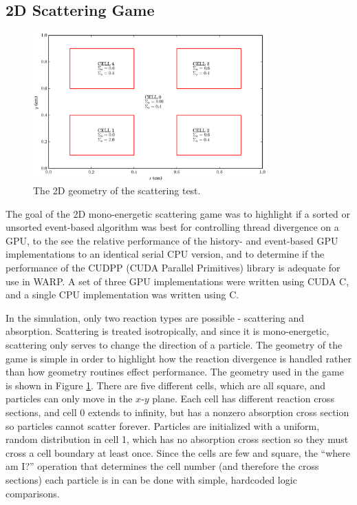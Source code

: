 \subsection{2D Scattering Game}

\begin{figure}[h!] 
  \centering
    \includegraphics[width=0.8\textwidth]{graphics/prelim_geom.eps}
     \caption{The 2D geometry of the scattering test. \label{prelim_geom} }
\end{figure}

The goal of the 2D mono-energetic scattering game was to highlight if a sorted or unsorted event-based algorithm was best for controlling thread divergence on a GPU, to the see the relative performance of the history- and event-based GPU implementations to an identical serial CPU version, and to determine if the performance of the CUDPP (CUDA Parallel Primitives) library is adequate for use in WARP.   A set of three GPU implementations were written using CUDA C, and a single CPU implementation was written using C.

In the simulation, only two reaction types are possible - scattering and absorption.  Scattering is treated isotropically, and since it is mono-energetic, scattering only serves to change the direction of a particle.  The geometry of the game is simple in order to highlight how the reaction divergence is handled rather than how geometry routines effect performance.   The geometry used in the game is shown in Figure \ref{prelim_geom}.  There are five different cells, which are all square, and particles can only move in the $x$-$y$ plane.  Each cell has different reaction cross sections, and cell 0 extends to infinity, but has a nonzero absorption cross section so particles cannot scatter forever.  Particles are initialized with a uniform, random distribution in cell 1, which has no absorption cross section so they must cross a cell boundary at least once.  Since the cells are few and square, the ``where am I?'' operation that determines the cell number (and therefore the cross sections) each particle is in can be done with simple, hardcoded logic comparisons.

